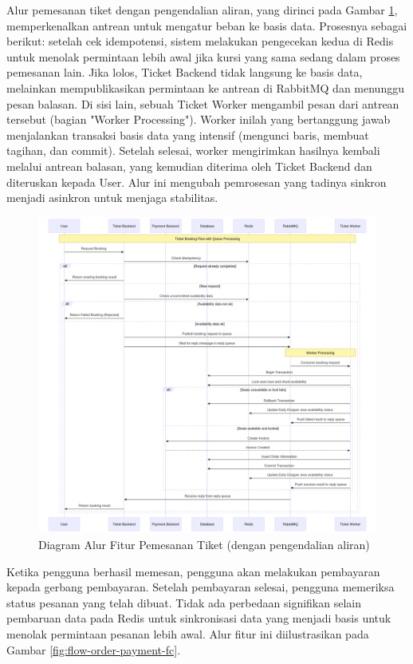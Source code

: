 Alur pemesanan tiket dengan pengendalian aliran, yang dirinci pada Gambar \ref{fig:flow-book-fc}, memperkenalkan antrean untuk mengatur beban ke basis data. Prosesnya sebagai berikut: setelah cek idempotensi, sistem melakukan pengecekan kedua di Redis untuk menolak permintaan lebih awal jika kursi yang sama sedang dalam proses pemesanan lain. Jika lolos, Ticket Backend tidak langsung ke basis data, melainkan mempublikasikan permintaan ke antrean di RabbitMQ dan menunggu pesan balasan. Di sisi lain, sebuah Ticket Worker mengambil pesan dari antrean tersebut (bagian "Worker Processing"). Worker inilah yang bertanggung jawab menjalankan transaksi basis data yang intensif (mengunci baris, membuat tagihan, dan commit). Setelah selesai, worker mengirimkan hasilnya kembali melalui antrean balasan, yang kemudian diterima oleh Ticket Backend dan diteruskan kepada User. Alur ini mengubah pemrosesan yang tadinya sinkron menjadi asinkron untuk menjaga stabilitas.

\begin{figure}[H]
    \centering
    \includegraphics[width=1\textwidth]{resources/chapter-3/book-async.png}
    \caption{Diagram Alur Fitur Pemesanan Tiket (dengan pengendalian aliran)}
    \label{fig:flow-book-fc}
\end{figure}

Ketika pengguna berhasil memesan, pengguna akan melakukan pembayaran kepada gerbang pembayaran. Setelah pembayaran selesai, pengguna memeriksa status pesanan yang telah dibuat. Tidak ada perbedaan signifikan selain pembaruan data pada Redis untuk sinkronisasi data yang menjadi basis untuk menolak permintaan pesanan lebih awal. Alur fitur ini diilustrasikan pada Gambar \ref{fig:flow-order-payment-fc}.

